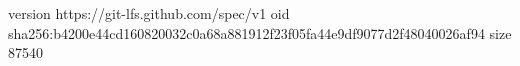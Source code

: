 version https://git-lfs.github.com/spec/v1
oid sha256:b4200e44cd160820032c0a68a881912f23f05fa44e9df9077d2f48040026af94
size 87540
